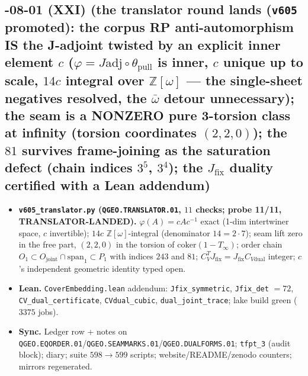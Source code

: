 \documentclass[11pt]{article}
\begin{document}
\subsection*{-08-01 (XXI) (the translator round lands (\texttt{v605} promoted): the corpus RP anti-automorphism IS the J-adjoint twisted by an explicit inner element $c$ ($\varphi=J\mathrm{adj}\circ\theta_{\mathrm{pull}}$ is inner, $c$ unique up to scale, $14c$ integral over $\mathbb{Z}[\omega]$ --- the single-sheet negatives resolved, the $\bar\omega$ detour unnecessary); the seam is a NONZERO pure 3-torsion class at infinity (torsion coordinates $(2,2,0)$); the $81$ survives frame-joining as the saturation defect (chain indices $3^5$, $3^4$); the $J_{\mathrm{fix}}$ duality certified with a Lean addendum)}
\begin{itemize}[leftmargin=1.5em]
\item \textbf{\texttt{v605\_translator.py} (\texttt{QGEO.TRANSLATOR.01}, $11$ checks; probe
11/11, TRANSLATOR-LANDED).} $\varphi(A)=cAc^{-1}$ exact (1-dim intertwiner space, $c$
invertible); $14c$ $\mathbb{Z}[\omega]$-integral (denominator $14=2\cdot7$); seam lift zero
in the free part, $(2,2,0)$ in the torsion of $\mathrm{coker}(1-T_\infty)$; order chain
$O_1\subset O_{\mathrm{joint}}\cap\mathrm{span}_1\subset P_1$ with indices $243$ and $81$;
$C_V^TJ_{\mathrm{fix}}=J_{\mathrm{fix}}C_{V\mathrm{dual}}$ integer; $c$'s independent
geometric identity typed open.
\item \textbf{Lean.} \texttt{CoverEmbedding.lean} addendum: \texttt{Jfix\_symmetric},
\texttt{Jfix\_det} $=72$, \texttt{CV\_dual\_certificate}, \texttt{CVdual\_cubic},
\texttt{dual\_joint\_trace}; lake build green ($3375$ jobs).
\item \textbf{Sync.} Ledger row + notes on
\texttt{QGEO.EQORDER.01}/\texttt{QGEO.SEAMMARKS.01}/\texttt{QGEO.DUALFORMS.01};
\texttt{tfpt\_3} (audit block); diary; suite $598\to599$ scripts; website/README/zenodo
counters; mirrors regenerated.
\end{itemize}
\end{document}

